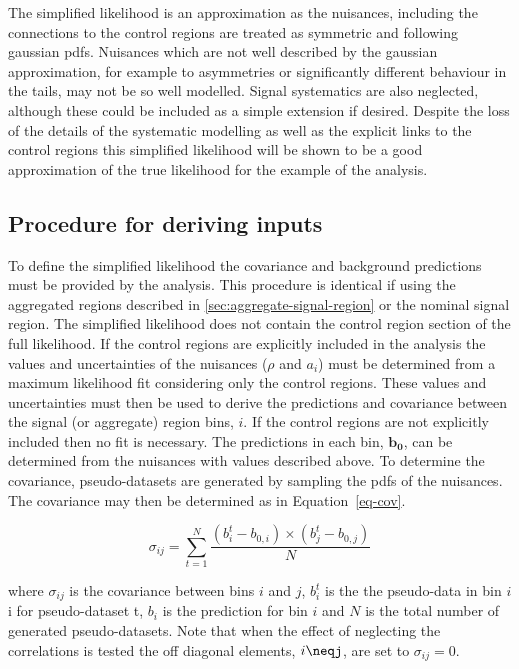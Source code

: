 The simplified likelihood is an approximation as the nuisances, including the connections
to the control regions are treated as symmetric and following gaussian pdfs.
Nuisances which are not well described by the gaussian approximation, for example 
to asymmetries or significantly different behaviour in the tails, may not be so well modelled.
Signal systematics are also neglected, although these could be included as a simple
extension if desired. Despite the loss of the details of the systematic modelling 
as well as the explicit links to the control regions this simplified likelihood will
be shown to be a good approximation of the true likelihood for the example of the
\alphat analysis. 

\subsection{Procedure for deriving inputs}

To define the simplified likelihood the covariance and background predictions must be 
provided by the analysis. This procedure is identical if using the 
aggregated regions described in \ref{sec:aggregate-signal-region} or the nominal signal region. 
The simplified likelihood does not contain the control region 
section of the full likelihood. If the control regions are explicitly included in the analysis
the values and uncertainties of the nuisances ($\rho$ and $a_i$)
must be determined from a maximum likelihood fit considering only the control regions.
These values and uncertainties must then be used to derive the predictions and covariance
between the signal (or aggregate) region bins, $i$. If the control regions are not explicitly 
included then no fit is necessary. The predictions in each bin, $\mathbf{b_0}$, can be 
determined from the nuisances with values described above. To determine the covariance, pseudo-datasets are generated
by sampling the pdfs of the nuisances. The covariance may then be determined as in Equation~\ref{eq-cov}.

\begin{equation}
\sigma_{ij}=\sum^N_{t=1}{\frac{(b^t_i-b_{0,i})\times(b^t_j-b_{0,j})}{N}}
\label{eq-cov}
\end{equation}

where $\sigma_{ij}$ is the covariance between bins $i$ and $j$, $b^t_i$ is the
the pseudo-data in bin $i$i for pseudo-dataset t, 
$b_i$ is the prediction for bin $i$ and $N$ is the total number of generated pseudo-datasets.
Note that when the effect of neglecting the correlations is tested the off diagonal 
elements, $i\neqj$, are set to $\sigma_{ij} = 0$.



